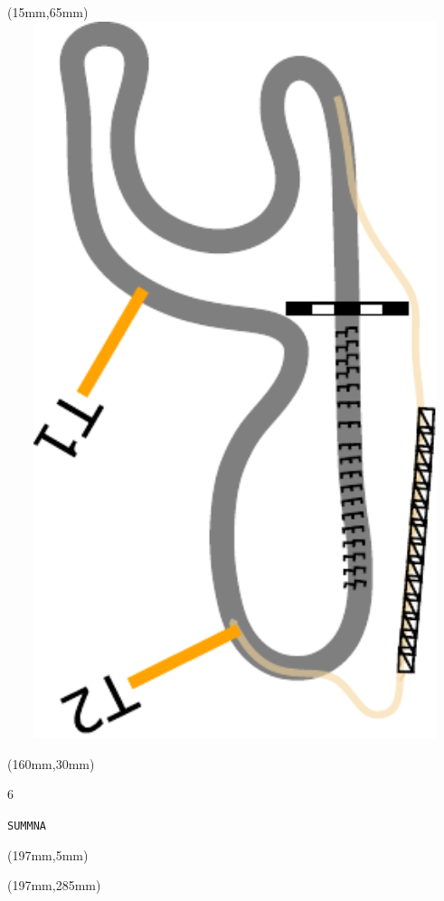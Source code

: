 \begin{textblock*}{185mm}(15mm,65mm)%
\centering
\mbox{\includegraphics[width=185mm,height=210mm,keepaspectratio]{PT/SUMMNA.pdf}}
\end{textblock*}
\begin{textblock*}{40mm}(160mm,30mm)%
\Large
\par{} 
\par6 
\par\hfill\tiny\tt SUMMNA\\
\end{textblock*}
\begin{textblock*}{20mm}(197mm,5mm)%
\fbox{\thepage}
\label{SUMMNA}
\end{textblock*}
\begin{textblock*}{20mm}(197mm,285mm)%
\fbox{\thepage}
\end{textblock*}

